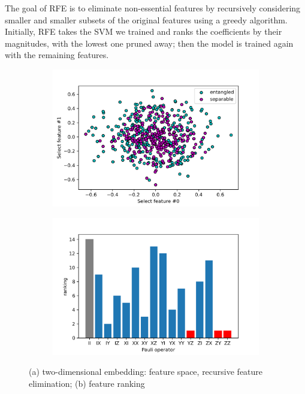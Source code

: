 \documentclass[
aps,
pra,
floatfix,
]{revtex4-2}
\theoremstyle{plain}
\theoremstyle{definition}
\begin{document}
The goal of RFE is to eliminate non-essential features by recursively considering smaller and smaller subsets of the original features using a greedy algorithm. Initially, RFE takes the SVM we trained and ranks the coeﬃcients by their magnitudes, with the lowest one pruned away; then the model is trained again with the remaining features.
\begin{figure}[!ht]
	\centering
	\begin{subfigure}{0.49\textwidth}
	\centering
		\includegraphics[width=.9\linewidth]{./Code/feature_space_2.png}
	\end{subfigure}
	\begin{subfigure}{0.49\textwidth}
	\centering
		\includegraphics[width=.9\linewidth]{./Code/feature_rank.png}
	\end{subfigure}
	\caption{(a) two-dimensional embedding: feature space, recursive feature elimination; (b) feature ranking}
\end{figure}
\end{document}
